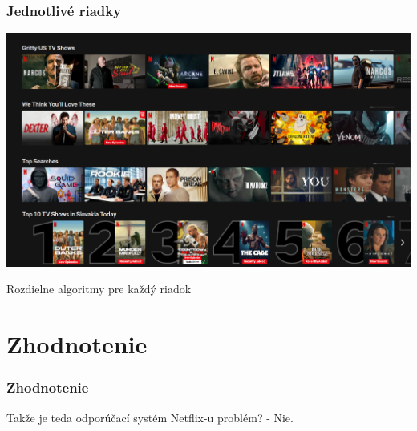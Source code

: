 \documentclass{beamer}
\begin{document}
\begin{frame}[fragile=singleslide]\frametitle{Jednotlivé riadky}

    \includegraphics[scale=.26]{NetflixMainPage2.png}

    {\tiny Rozdielne algoritmy pre každý riadok}


\end{frame}









\section*{Zhodnotenie}
\begin{frame}[fragile=singleslide]\frametitle{Zhodnotenie}

    Takže je teda odporúčací systém Netflix-u problém? - Nie.


\end{frame}
\end{document}
